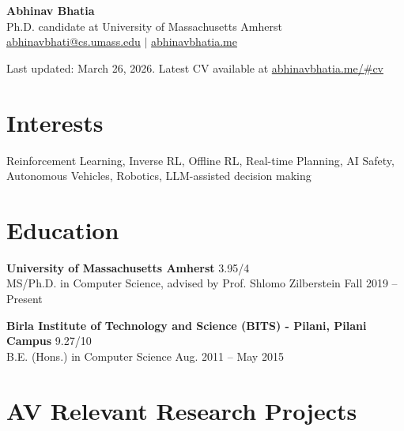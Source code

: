 \documentclass[letterpaper,11pt]{article}
\begin{document}
{\LARGE \textbf{Abhinav Bhatia}}\\
Ph.D. candidate at University of Massachusetts Amherst \\
\href{mailto:abhinavbhati@cs.umass.edu}{abhinavbhati@cs.umass.edu} $|$ \href{https://abhinavbhatia.me}{abhinavbhatia.me}

{\small Last updated: March 26, 2026. Latest CV available at \href{https://abhinavbhatia.me/#cv}{abhinavbhatia.me/\#cv}}

\section*{Interests}
Reinforcement Learning, Inverse RL, Offline RL, Real-time Planning, AI Safety, Autonomous Vehicles, Robotics, LLM-assisted decision making

\section*{Education}
\textbf{University of Massachusetts Amherst} \hfill 3.95/4\\
MS/Ph.D. in Computer Science, advised by Prof. Shlomo Zilberstein \hfill Fall 2019 -- Present

\textbf{Birla Institute of Technology and Science (BITS) - Pilani, Pilani Campus} \hfill 9.27/10\\
B.E. (Hons.) in Computer Science \hfill Aug. 2011 -- May 2015

\section*{AV Relevant Research Projects}
\end{document}
